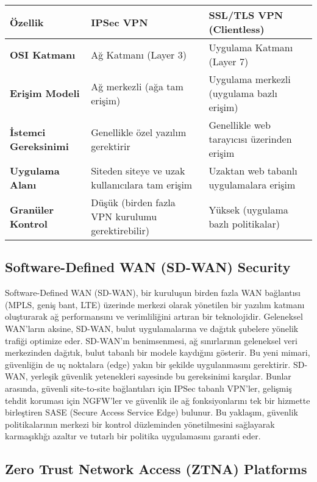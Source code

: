 \begin{adjustbox}{max width=\textwidth}
\begin{tabularx}{\textwidth}{|l|X|X|}
\hline
\textbf{Özellik} & \textbf{IPSec VPN} & \textbf{SSL/TLS VPN (Clientless)} \\
\hline
\textbf{OSI Katmanı} & Ağ Katmanı (Layer 3) & Uygulama Katmanı (Layer 7) \\
\hline
\textbf{Erişim Modeli} & Ağ merkezli (ağa tam erişim) & Uygulama merkezli (uygulama bazlı erişim) \\
\hline
\textbf{İstemci Gereksinimi} & Genellikle özel yazılım gerektirir & Genellikle web tarayıcısı üzerinden erişim \\
\hline
\textbf{Uygulama Alanı} & Siteden siteye ve uzak kullanıcılara tam erişim & Uzaktan web tabanlı uygulamalara erişim \\
\hline
\textbf{Granüler Kontrol} & Düşük (birden fazla VPN kurulumu gerektirebilir) & Yüksek (uygulama bazlı politikalar) \\
\hline
\end{tabularx}
\end{adjustbox}



\subsection{Software-Defined WAN (SD-WAN) Security}

Software-Defined WAN (SD-WAN), bir kuruluşun birden fazla WAN bağlantısı (MPLS, geniş bant, LTE) üzerinde merkezi olarak yönetilen bir yazılım katmanı oluşturarak ağ performansını ve verimliliğini artıran bir teknolojidir. Geleneksel WAN'ların aksine, SD-WAN, bulut uygulamalarına ve dağıtık şubelere yönelik trafiği optimize eder.
SD-WAN'ın benimsenmesi, ağ sınırlarının geleneksel veri merkezinden dağıtık, bulut tabanlı bir modele kaydığını gösterir. Bu yeni mimari, güvenliğin de uç noktalara (edge) yakın bir şekilde uygulanmasını gerektirir. SD-WAN, yerleşik güvenlik yetenekleri sayesinde bu gereksinimi karşılar. Bunlar arasında, güvenli site-to-site bağlantıları için IPSec tabanlı VPN'ler, gelişmiş tehdit koruması için NGFW'ler ve güvenlik ile ağ fonksiyonlarını tek bir hizmette birleştiren SASE (Secure Access Service Edge) bulunur.
Bu yaklaşım, güvenlik politikalarının merkezi bir kontrol düzleminden yönetilmesini sağlayarak karmaşıklığı azaltır ve tutarlı bir politika uygulamasını garanti eder.

\subsection{Zero Trust Network Access (ZTNA) Platforms}

